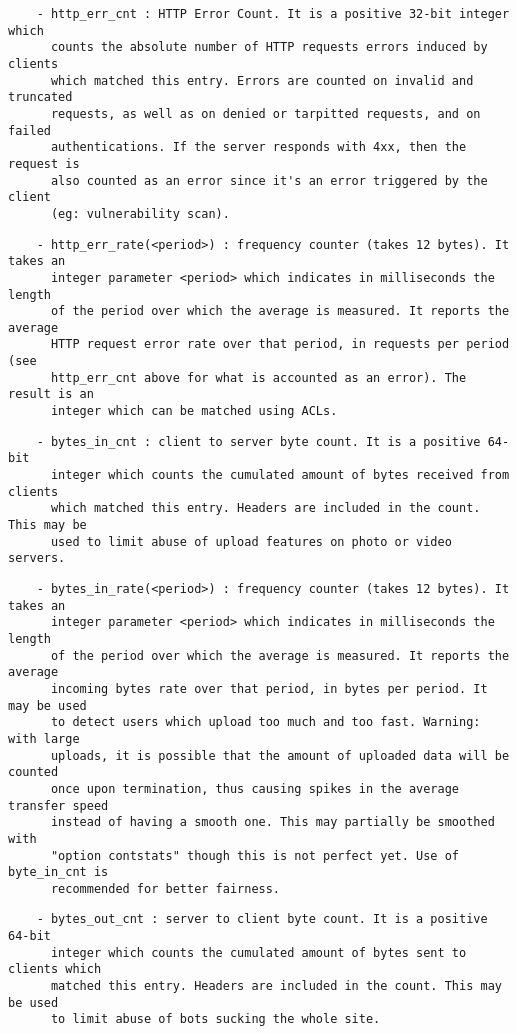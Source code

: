 \begin{verbatim}
    - http_err_cnt : HTTP Error Count. It is a positive 32-bit integer which
      counts the absolute number of HTTP requests errors induced by clients
      which matched this entry. Errors are counted on invalid and truncated
      requests, as well as on denied or tarpitted requests, and on failed
      authentications. If the server responds with 4xx, then the request is
      also counted as an error since it's an error triggered by the client
      (eg: vulnerability scan).
\end{verbatim}

\begin{verbatim}
    - http_err_rate(<period>) : frequency counter (takes 12 bytes). It takes an
      integer parameter <period> which indicates in milliseconds the length
      of the period over which the average is measured. It reports the average
      HTTP request error rate over that period, in requests per period (see
      http_err_cnt above for what is accounted as an error). The result is an
      integer which can be matched using ACLs.
\end{verbatim}

\begin{verbatim}
    - bytes_in_cnt : client to server byte count. It is a positive 64-bit
      integer which counts the cumulated amount of bytes received from clients
      which matched this entry. Headers are included in the count. This may be
      used to limit abuse of upload features on photo or video servers.
\end{verbatim}

\begin{verbatim}
    - bytes_in_rate(<period>) : frequency counter (takes 12 bytes). It takes an
      integer parameter <period> which indicates in milliseconds the length
      of the period over which the average is measured. It reports the average
      incoming bytes rate over that period, in bytes per period. It may be used
      to detect users which upload too much and too fast. Warning: with large
      uploads, it is possible that the amount of uploaded data will be counted
      once upon termination, thus causing spikes in the average transfer speed
      instead of having a smooth one. This may partially be smoothed with
      "option contstats" though this is not perfect yet. Use of byte_in_cnt is
      recommended for better fairness.
\end{verbatim}

\begin{verbatim}
    - bytes_out_cnt : server to client byte count. It is a positive 64-bit
      integer which counts the cumulated amount of bytes sent to clients which
      matched this entry. Headers are included in the count. This may be used
      to limit abuse of bots sucking the whole site.
\end{verbatim}

